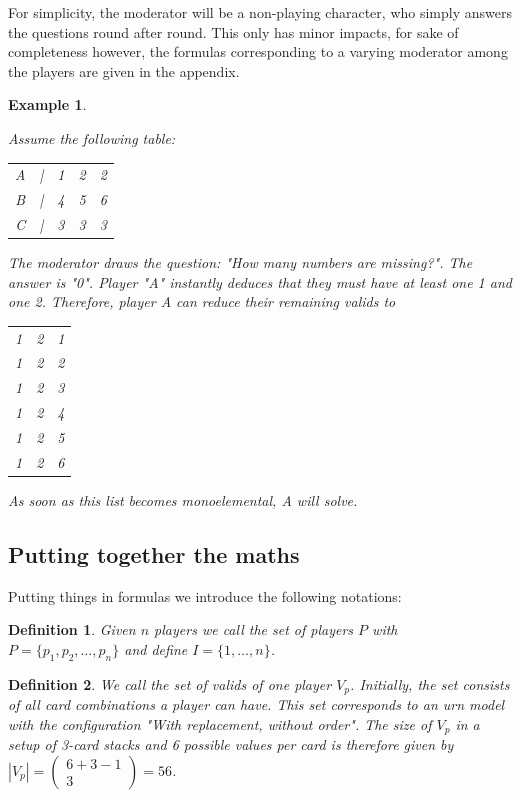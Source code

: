 \documentclass{article}
\newtheorem{definition}{Definition}[section]
\newtheorem{example}{Example}[section]
\begin{document}
For simplicity, the moderator will be a non-playing character, who simply answers the questions round after round. This only has minor impacts, for sake of completeness however, the formulas corresponding to a varying moderator among the players are given in the appendix.

\begin{example}\label{ex:Base}

Assume the following table:

\begin{tabular}{ccccc}
A & | & 1 & 2 & 2 \\
B & | & 4 & 5 & 6 \\
C & | & 3 & 3 & 3
\end{tabular}

The moderator draws the question: "How many numbers are missing?". The answer is "0". Player "A" instantly deduces that they must have at least one 1 and one 2. Therefore, player A can reduce their remaining valids to 

\begin{center}
\begin{tabular}{ccc}
1 & 2 & 1 \\
1 & 2 & 2 \\
1 & 2 & 3 \\
1 & 2 & 4 \\
1 & 2 & 5 \\
1 & 2 & 6
\end{tabular}
\end{center}

As soon as this list becomes monoelemental, A will solve.

\end{example}

\subsection{Putting together the maths}

Putting things in formulas we introduce the following notations:

\begin{definition}

Given $n$ players we call the set of players $P$ with $P = \{p_1, p_2, \ldots, p_n \}$ and define $I = \{1, \ldots, n\}$.

\end{definition}

\begin{definition}

We call the set of valids of one player $V_p$. Initially, the set consists of all card combinations a player can have. This set corresponds to an urn model with the configuration "With replacement, without order". The size of $V_p$ in a setup of 3-card stacks and 6 possible values per card is therefore given by $|V_p| = \left( \begin{array}{c}6+3-1 \\ 3 \end{array} \right) = 56$.

\end{definition}
\end{document}
